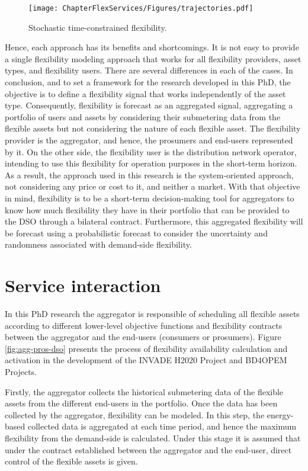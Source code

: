 \begin{figure}[htbp]
	\centering
	\texttt{[image: ChapterFlexServices/Figures/trajectories.pdf]}
		\caption{Stochastic time-constrained flexibility.}
	\label{fig:system}  
\end{figure}

Hence, each approach has its benefits and shortcomings. It is not easy to provide a single flexibility modeling approach that works for all flexibility providers, asset types, and flexibility users. There are several differences in each of the cases. In conclusion, and to set a framework for the research developed in this PhD, the objective is to define a flexibility signal that works independently of the asset type. Consequently, flexibility is forecast as an aggregated signal, aggregating a portfolio of users and assets by considering their submetering data from the flexible assets but not considering the nature of each flexible asset. 
The flexibility provider is the aggregator, and hence, the prosumers and end-users represented by it. On the other side, the flexibility user is the distribution network operator, intending to use this flexibility for operation purposes in the short-term horizon. As a result, the approach used in this research is the system-oriented approach, not considering any price or cost to it, and neither a market. With that objective in mind, flexibility is to be a short-term decision-making tool for aggregators to know how much flexibility they have in their portfolio that can be provided to the DSO through a bilateral contract. Furthermore, this aggregated flexibility will be forecast using a probabilistic forecast to consider the uncertainty and randomness associated with demand-side flexibility. 

\section{Service interaction}

In this PhD research the aggregator is responsible of scheduling all flexible assets according to different lower-level objective functions and flexibility contracts between the aggregator and the end-users (consumers or prosumers). Figure \ref{fig:agg-pros-dso} presents the process of flexibility availability calculation and activation in the development of the INVADE H2020 Project and BD4OPEM Projects. 

Firstly, the aggregator collects the historical submetering data of the flexible assets from the different end-users in the portfolio. Once the data has been collected by the aggregator, flexibility can be modeled. In this step, the energy-based collected data is aggregated at each time period, and hence the maximum flexibility from the demand-side is calculated. Under this stage it is assumed that under the contract established between the aggregator and the end-user, direct control of the flexible assets is given. 

